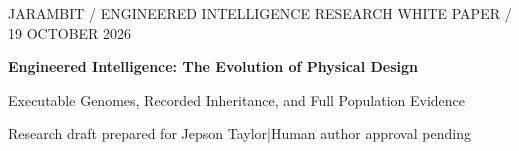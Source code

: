 \documentclass[10pt,journal,letterpaper]{IEEEtran}
\begin{document}
\onecolumn
\thispagestyle{empty}
\begin{center}
{\sffamily\color{teal}\small JARAMBIT / ENGINEERED INTELLIGENCE RESEARCH WHITE PAPER / 19 OCTOBER 2026}\par\vspace{5mm}
{\sffamily\bfseries\color{ink}\fontsize{25}{28}\selectfont Engineered Intelligence: The Evolution of Physical Design}\par\vspace{3.5mm}
{\sffamily\color{ink}\fontsize{14}{18}\selectfont Executable Genomes, Recorded Inheritance, and Full Population Evidence}\par\vspace{3.5mm}
{\small Research draft prepared for Jepson Taylor\quad|\quad Human author approval pending}\par
\end{center}
\vspace{2.5mm}
\end{document}

